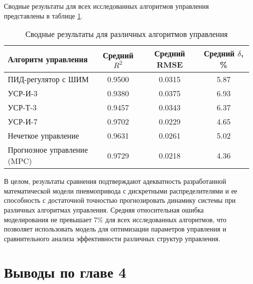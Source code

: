Сводные результаты для всех исследованных алгоритмов управления представлены в таблице \ref{tab:validation_summary}.

\begin{table}[ht]
	\centering
	\caption{Сводные результаты для различных алгоритмов управления}
	\small
	\label{tab:validation_summary}
	\begin{tabular}{lccc}
		\hline
		\textbf{Алгоритм управления} & \textbf{Средний $R^2$} & \textbf{Средний RMSE} & \textbf{Средний $\delta$, \%} \\
		\hline
		ПИД-регулятор с ШИМ          & \num{0.9500}           & \num{0.0315}          & \num{5.87}                    \\
		УСР-И-3                      & \num{0.9380}           & \num{0.0375}          & \num{6.93}                    \\
		УСР-Т-3                      & \num{0.9457}           & \num{0.0343}          & \num{6.37}                    \\
		УСР-И-7                      & \num{0.9702}           & \num{0.0229}          & \num{4.65}                    \\
		Нечеткое управление          & \num{0.9631}           & \num{0.0261}          & \num{5.02}                    \\
		Прогнозное управление (MPC)  & \num{0.9729}           & \num{0.0218}          & \num{4.36}                    \\
		\hline
	\end{tabular}
\end{table}

В целом, результаты сравнения подтверждают адекватность
разработанной математической модели пневмопривода с дискретными распределителями и ее
способность с достаточной точностью прогнозировать динамику системы при
различных алгоритмах управления. Средняя относительная ошибка моделирования
не превышает 7\% для всех исследованных алгоритмов, что позволяет
использовать модель для оптимизации параметров управления
и сравнительного анализа эффективности различных структур управления.

\section{Выводы по главе 4}

